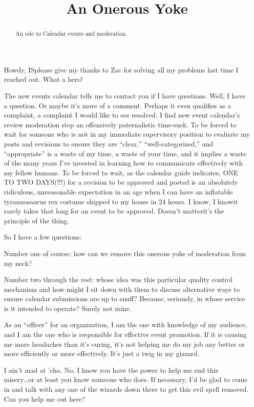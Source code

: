 \documentclass[12pt, letterpaper, final]{article}
\title{An Onerous Yoke}
\author{}
\date{}
\begin{document}
\maketitle
\vspace{-1in}

\begin{abstract}
    \begin{center}
        An ode to Calendar events and moderation.
    \end{center}
\end{abstract}

Howdy, IS\textemdash please give my thanks to Zac for solving all my problems last time I reached out.
What a hero!

The new events calendar tells me to contact you if I have questions.
Well, I have a question.
Or maybe it's more of a comment.
Perhaps it even qualifies as a complaint, a complaint I would like to see resolved.
I find new event calendar's review moderation step an offensively paternalistic time-suck.
To be forced to wait for someone who is not in my immediate supervisory position to evaluate my posts and revisions to ensure they are “clear,” “well-categorized,” and “appropriate” is a waste of my time, a waste of your time, and it implies a waste of the many years I've invested in learning how to communicate effectively with my fellow humans.
To be forced to wait, as the calendar guide indicates, {\large ONE TO TWO DAYS(!!!)} for a revision to be approved and posted is an absolutely ridiculous, unreasonable expectation in an age when I can have an inflatable tyrannosaurus rex costume shipped to my house in 24 hours.
I know, I know\textemdash it rarely takes that long for an event to be approved.
Doesn't matter\textemdash it's the principle of the thing.

So I have a few questions:

Number one of course: how can we remove this {\Huge onerous yoke} of moderation from my neck?

Number two through the rest: whose idea was this particular quality control mechanism and how might I sit down with them to discuss alternative ways to ensure calendar submissions are up to snuff?
Because, seriously, in whose service is it intended to operate? Surely not mine.

As an “officer” for an organization, I am the one with knowledge of my audience, and I am the one who is responsible for effective event promotion.
If it is causing me more headaches than it's curing, it's not helping me do my job any better or more efficiently or more effectively.
It's just a twig in my gizzard.

I ain't mad at 'cha.
No, I know you have the power to help me end this \\misery\ldots or at least you know someone who does.
If necessary, I'd be glad to come in and talk with any one of the wizards down there to get this evil spell removed.
Can you help me out here?
\end{document}

